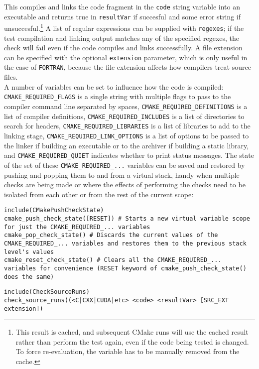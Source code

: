 \documentclass[8pt, table, xcdraw]{article}%
\begin{document}
This compiles and links the code fragment in the \lstinline{code} string variable into an executable and returns true in \lstinline{resultVar} if succesful and some error string if unsuccesful.\footnote{This result is cached, and subsequent CMake runs will use the cached result rather than perform the test again, even if the code being tested is changed. To force re-evaluation, the variable has to be manually removed from the cache.} A list of regular expressions can be supplied with \lstinline{regexes}; if the test compilation and linking output matches any of the specified regexes, the check will fail even if the code compiles and links successfully. A file extension can be specified with the optional \lstinline{extension} parameter, which is only useful in the case of \lstinline{FORTRAN}, because the file extension affects how compilers treat source files.\\
A number of variables can be set to influence how the code is compiled: \lstinline{CMAKE_REQUIRED_FLAGS} is a single string with multiple flags to pass to the compiler command line separated by spaces, \lstinline{CMAKE_REQUIRED_DEFINITIONS} is a list of compiler definitions, \lstinline{CMAKE_REQUIRED_INCLUDES} is a list of directories to search for headers, \lstinline{CMAKE_REQUIRED_LIBRARIES} is a list of libraries to add to the linking stage, \lstinline{CMAKE_REQUIRED_LINK_OPTIONS} is a list of options to be passed to the linker if building an executable or to the archiver if
building a static library, and \lstinline{CMAKE_REQUIRED_QUIET} indicates whether to print status messages. The state of the set of these \lstinline{CMAKE_REQUIRED_...} variables can be saved and restored by pushing and popping them to and from a virtual stack, handy when multiple checks are being made or where the effects of performing the checks need to be isolated from each other or from the rest of the current scope:

\begin{lstlisting}
include(CMakePushCheckState)
cmake_push_check_state([RESET]) # Starts a new virtual variable scope for just the CMAKE_REQUIRED_... variables
cmake_pop_check_state() # Discards the current values of the CMAKE_REQUIRED_... variables and restores them to the previous stack level's values
cmake_reset_check_state() # Clears all the CMAKE_REQUIRED_... variables for convenience (RESET keyword of cmake_push_check_state() does the same)
\end{lstlisting}

\begin{lstlisting}
include(CheckSourceRuns)
check_source_runs((<C|CXX|CUDA|etc> <code> <resultVar> [SRC_EXT extension])
\end{lstlisting}
\end{document}
